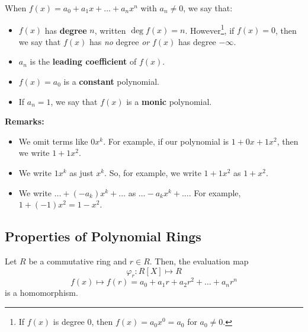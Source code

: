 \documentclass[letterpaper]{article}
\begin{document}
\begin{definition}{}{}
    When $f(x) = a_0 + a_1 x + \dots + a_n x^n$ with $a_n \neq 0$, we say that: 
    \begin{itemize}
        \item $f(x)$ has \textbf{degree} $n$, written $\deg f(x) = n$. However\footnote{If $f(x)$ is degree 0, then $f(x) = a_0 x^0 = a_0$ for $a_0 \neq 0$.}, if $f(x) = 0$, then we say that $f(x)$ has \emph{no} degree \emph{or} $f(x)$ has degree $-\infty$. 
        \item $a_n$ is the \textbf{leading coefficient} of $f(x)$. 
        \item $f(x) = a_0$ is a \textbf{constant} polynomial.
        \item If $a_n = 1$, we say that $f(x)$ is a \textbf{monic} polynomial.
    \end{itemize}
\end{definition}
\textbf{Remarks:}
\begin{itemize}
    \item We omit terms like $0x^k$. For example, if our polynomial is $1 + 0x + 1x^2$, then we write $1 + 1x^2$.
    \item We write $1x^k$ as just $x^k$. So, for example, we write $1 + 1x^2$ as $1 + x^2$. 
    \item We write $\dots + (-a_k) x^k + \dots$ as $\dots - a_k x^k + \dots$. For example, $1 + (-1)x^2 = 1 - x^2$.
\end{itemize}

\subsection{Properties of Polynomial Rings}

\begin{proposition}
    Let $R$ be a commutative ring and $r \in R$. Then, the evaluation map 
    \[\varphi_{r}: R[X] \mapsto R\]
    \[f(x) \mapsto f(r) = a_0 + a_1 r + a_2 r^2 + \dots + a_n r^n\]
    is a homomorphism.
\end{proposition}
\end{document}
